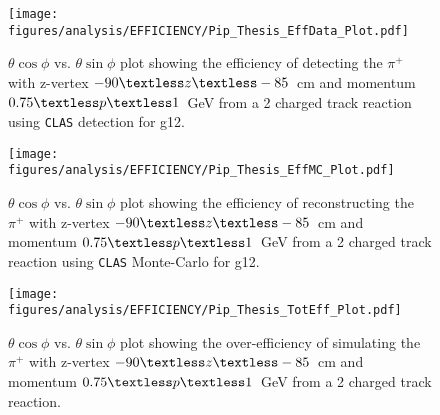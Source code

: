 \documentclass[11pt,a4paper]{article}
\newcommand{\abbr}[1]{\textsc{\texttt{#1}}}
\def\figures{/Users/michaelkunkel/WORK/GIT_HUB/THESIS/figures/print}
\newlength{\figwidth}
\newlength{\hfigheight}
\begin{document}
\begin{figure}[h!]\begin{center}
    \texttt{[image: \\figures/analysis/EFFICIENCY/Pip\_Thesis\_EffData\_Plot.pdf]}
    \caption[$\theta \cos\phi$ vs. $\theta \sin\phi$ plot showing the efficiency of detecting the $\pi^+$ with z-vertex $-90\textless z\textless-85$~cm and momentum $0.75\textless p \textless 1$~GeV from a 2 charged track reaction using \abbr{CLAS} detection for g12]{\label{fig:eff_pip_data} $\theta \cos\phi$ vs. $\theta \sin\phi$ plot showing the efficiency of detecting the $\pi^+$ with z-vertex $-90\textless z\textless-85$~cm and momentum $0.75\textless p \textless 1$~GeV from a 2 charged track reaction using \abbr{CLAS} detection for g12.}
  \end{center}\end{figure}
%
\begin{figure}[h!]\begin{center}
    \texttt{[image: \\figures/analysis/EFFICIENCY/Pip\_Thesis\_EffMC\_Plot.pdf]}
    \caption[$\theta \cos\phi$ vs. $\theta \sin\phi$ plot showing the efficiency of reconstructing the $\pi^+$ with z-vertex $-90\textless z\textless-85$~cm and momentum $0.75\textless p \textless 1$~GeV from a 2 charged track reaction using \abbr{CLAS} Monte-Carlo for g12]{\label{fig:eff_pip_MC} $\theta \cos\phi$ vs. $\theta \sin\phi$ plot showing the efficiency of reconstructing the $\pi^+$ with z-vertex $-90\textless z\textless-85$~cm and momentum $0.75\textless p \textless 1$~GeV from a 2 charged track reaction using \abbr{CLAS} Monte-Carlo for g12.}
  \end{center}\end{figure}
%
\begin{figure}[h!]\begin{center}
    \texttt{[image: \\figures/analysis/EFFICIENCY/Pip\_Thesis\_TotEff\_Plot.pdf]}
    \caption[$\theta \cos\phi$ vs. $\theta \sin\phi$ plot showing the over-efficiency of simulating the $\pi^+$ with z-vertex $-90\textless z\textless-85$~cm and momentum $0.75\textless p \textless 1$~GeV from a 2 charged track reaction]{\label{fig:toteff_pip} $\theta \cos\phi$ vs. $\theta \sin\phi$ plot showing the over-efficiency of simulating the $\pi^+$ with z-vertex $-90\textless z\textless-85$~cm and momentum $0.75\textless p \textless 1$~GeV from a 2 charged track reaction.}
  \end{center}\end{figure}
\end{document}
